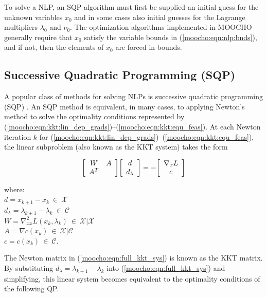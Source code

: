 \documentclass[pdf,ps2pdf,11pt]{SANDreport}
\begin{document}
To solve a NLP, an SQP algorithm must first be supplied an initial guess for
the unknown variables $x_0$ and in some cases also initial guesses for the
Lagrange multipliers $\lambda_0$ and $\nu_0$.  The optimization algorithms
implemented in MOOCHO generally require that $x_0$ satisfy the variable bounds
in (\ref{moocho:eqn:nlp:bnds}), and if not, then the elements of $x_0$ are
forced in bounds.

%
\subsection{Successive Quadratic Programming (SQP)}
\label{moocho:sec:SQP}
%

A popular class of methods for solving NLPs is successive quadratic
programming (SQP) {}\cite{ref:boggs_tolle_1996}.  An SQP method is
equivalent, in many cases, to applying Newton's method to solve the
optimality conditions represented by
(\ref{moocho:eqn:kkt:lin_dep_grads})--(\ref{moocho:eqn:kkt:equ_feas}).
At each Newton iteration $k$ for
(\ref{moocho:eqn:kkt:lin_dep_grads})--(\ref{moocho:eqn:kkt:equ_feas}),
the linear subproblem (also known as the KKT system) takes the form

{\bsinglespace
\begin{equation}
{\bmat{cc}
	W    & A \\
	A^T  &
\emat}
{\bmat{c}
	d \\
	d_{\lambda}
\emat}
=
-
{\bmat{c}
	\nabla_x L \\
	c
\emat}
\label{moocho:eqn:full_kkt_sys}
\end{equation}
\begin{tabbing}
\hspace{4ex}where:\hspace{5ex}\= \\
\>	$d = x_{k+1} - x_k \:\in\:\mathcal{X}$ \\
\>	$d_{\lambda} = \lambda_{k+1} - \lambda_k \:\in\:\mathcal{C}$ \\
\>	$W = \nabla_{xx}^2 L(x_k,\lambda_k) \:\in\:\mathcal{X}|\mathcal{X}$ \\
\>	$A = \nabla c(x_k) \:\in\:\mathcal{X}|\mathcal{C}$ \\
\>	$c = c(x_k) \:\in\:\mathcal{C}$.
\end{tabbing}
\esinglespace}

The Newton matrix in (\ref{moocho:eqn:full_kkt_sys}) is known as the KKT matrix.
By substituting $d_{\lambda} = {}\lambda_{k+1} - {}\lambda_k$ into
(\ref{moocho:eqn:full_kkt_sys}) and simplifying, this linear system becomes
equivalent to the optimality conditions of the following QP.
\end{document}

